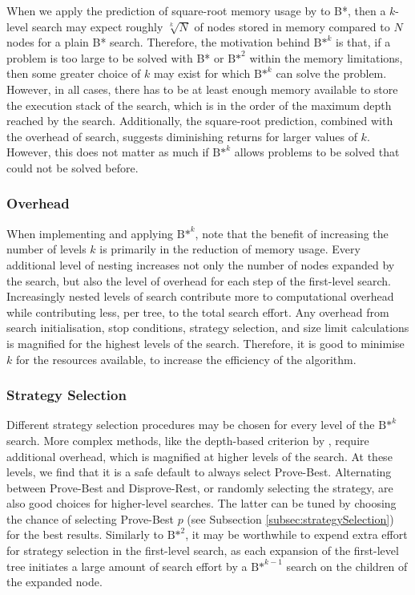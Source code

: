 When we apply the prediction of square-root memory usage by  to B*, then a $k$-level search may expect roughly $\sqrt[k]{N}$ of nodes stored in memory compared to $N$ nodes for a plain B* search. Therefore, the motivation behind ${\text{B*}}^k$ is that, if a problem is too large to be solved with B* or ${\text{B*}}^2$ within the memory limitations, then some greater choice of $k$ may exist for which ${\text{B*}}^k$ can solve the problem.
However, in all cases, there has to be at least enough memory available to store the execution stack of the search, which is in the order of the maximum depth reached by the search.
Additionally, the square-root prediction, combined with the overhead of search, suggests diminishing returns for larger values of $k$. However, this does not matter as much if ${\text{B*}}^k$ allows problems to be solved that could not be solved before.

\subsubsection{Overhead}
When implementing and applying ${\text{B*}}^k$, note that the benefit of increasing the number of levels $k$ is primarily in the reduction of memory usage. Every additional level of nesting increases not only the number of nodes expanded by the search, but also the level of overhead for each step of the first-level search. Increasingly nested levels of search contribute more to computational overhead while contributing less, per tree, to the total search effort. Any overhead from search initialisation, stop conditions, strategy selection, and size limit calculations is magnified for the highest levels of the search. Therefore, it is good to minimise $k$ for the resources available, to increase the efficiency of the algorithm.

\subsubsection{Strategy Selection}
Different strategy selection procedures may be chosen for every level of the ${\text{B*}}^k$ search. More complex methods, like the depth-based criterion by , require additional overhead, which is magnified at higher levels of the search. At these levels, we find that it is a safe default to always select Prove-Best. Alternating between Prove-Best and Disprove-Rest, or randomly selecting the strategy, are also good choices for higher-level searches. The latter can be tuned by choosing the chance of selecting Prove-Best $p$ (see Subsection \ref{subsec:strategySelection}) for the best results. Similarly to ${\text{B*}}^2$, it may be worthwhile to expend extra effort for strategy selection in the first-level search, as each expansion of the first-level tree initiates a large amount of search effort by a ${\text{B*}}^{k-1}$ search on the children of the expanded node.

